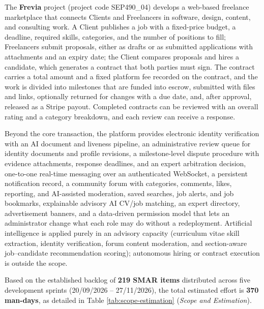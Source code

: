 The \textbf{Frevia} project (project code SEP490\_04) develops a web-based freelance marketplace that connects Clients and Freelancers in software, design, content, and consulting work. A Client publishes a job with a fixed-price budget, a deadline, required skills, categories, and the number of positions to fill; Freelancers submit proposals, either as drafts or as submitted applications with attachments and an expiry date; the Client compares proposals and hires a candidate, which generates a contract that both parties must sign. The contract carries a total amount and a fixed platform fee recorded on the contract, and the work is divided into milestones that are funded into escrow, submitted with files and links, optionally returned for changes with a due date, and, after approval, released as a Stripe payout. Completed contracts can be reviewed with an overall rating and a category breakdown, and each review can receive a response.

Beyond the core transaction, the platform provides electronic identity verification with an AI document and liveness pipeline, an administrative review queue for identity documents and profile revisions, a milestone-level dispute procedure with evidence attachments, response deadlines, and an expert arbitration decision, one-to-one real-time messaging over an authenticated WebSocket, a persistent notification record, a community forum with categories, comments, likes, reporting, and AI-assisted moderation, saved searches, job alerts, and job bookmarks, explainable advisory AI CV/job matching, an expert directory, advertisement banners, and a data-driven permission model that lets an administrator change what each role may do without a redeployment. Artificial intelligence is applied purely in an advisory capacity (curriculum vitae skill extraction, identity verification, forum content moderation, and section-aware job--candidate recommendation scoring); autonomous hiring or contract execution is outside the scope.

Based on the established backlog of \textbf{219 SMAR items} distributed across five development sprints (20/09/2026 -- 27/11/2026), the total estimated effort is \textbf{370 man-days}, as detailed in Table \ref{tab:scope-estimation} (\textit{Scope and Estimation}).


